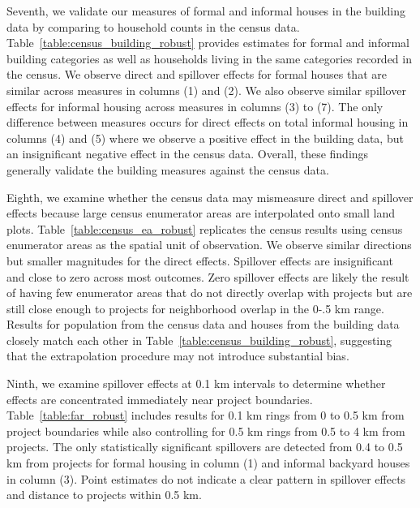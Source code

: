 \documentclass[12pt]{article}
\newcommand{\rv}{}
\begin{document}
\rv{Seventh, we validate our measures of formal and informal houses in the building data by comparing to household counts in the census data.  Table~\ref{table:census_building_robust} provides estimates for formal and informal building categories as well as households living in the same categories recorded in the census.  We observe direct and spillover effects for formal houses that are similar across measures in columns (1) and (2).  We also observe similar spillover effects for informal housing across measures in columns (3) to (7).  The only difference between measures occurs for direct effects on total informal housing in columns (4) and (5) where we observe a positive effect in the building data, but an insignificant negative effect in the census data.  Overall, these findings generally validate the building measures against the census data.}

\rv{Eighth, we examine whether the census data may mismeasure direct and spillover effects because large census enumerator areas are interpolated onto small land plots.  Table~\ref{table:census_ea_robust} replicates the census results using census enumerator areas as the spatial unit of observation.  We observe similar directions but smaller magnitudes for the direct effects.  Spillover effects are insignificant and close to zero across most outcomes.  Zero spillover effects are likely the result of having few enumerator areas that do not directly overlap with projects but are still close enough to projects for neighborhood overlap in the 0-.5 km range.  Results for population from the census data and houses from the building data closely match each other in Table~\ref{table:census_building_robust}, suggesting that the extrapolation procedure may not introduce substantial bias. }


\rv{Ninth, we examine spillover effects at 0.1 km intervals to determine whether effects are concentrated immediately near project boundaries.  Table~\ref{table:far_robust} includes results for 0.1 km rings from 0 to 0.5 km from project boundaries while also controlling for 0.5 km rings from 0.5 to 4 km from projects.  The only statistically significant spillovers are detected from 0.4 to 0.5 km from projects for formal housing in column (1) and informal backyard houses in column (3).  Point estimates do not indicate a clear pattern in spillover effects and distance to projects within 0.5 km.  }




\end{document}
